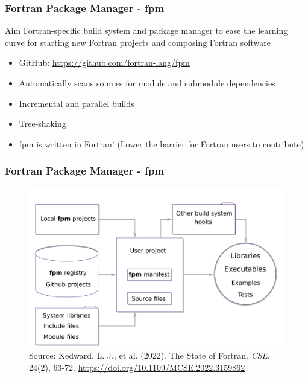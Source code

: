 \documentclass[aspectratio=169]{beamer}
\begin{document}
\begin{frame}
\frametitle{Fortran Package Manager - fpm}
\begin{block}{Aim}
Fortran-specific build system and package manager to ease the learning curve for starting new Fortran projects and composing Fortran software
\end{block}
\begin{itemize}
    \item GitHub: \url{https://github.com/fortran-lang/fpm}
    \item Automatically scans sources for module and submodule dependencies
    \item Incremental and parallel builds
    \item Tree-shaking
    \item fpm is written in Fortran! (Lower the barrier for Fortran users to contribute)
\end{itemize}
\end{frame}


\begin{frame}
\frametitle{Fortran Package Manager - fpm}
    \begin{figure}
        \includegraphics[width=.7\textwidth]{fpm_diagram}\\
        {\footnotesize Source: Kedward, L. J., et al. (2022). The State of Fortran. \textit{CSE}, 24(2), 63-72. \url{https://doi.org/10.1109/MCSE.2022.3159862}}
    \end{figure}
\end{frame}
\end{document}
